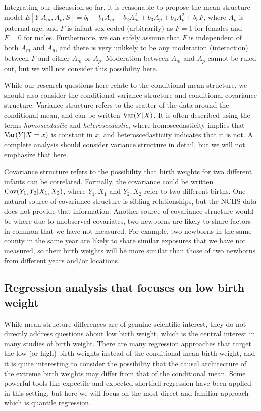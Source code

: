 Integrating our discussion so far, it is reasonable to propose the mean structure model $E[Y|A_m, A_p, S] = b_0 + b_1 A_m + b_2 A_m^2 + b_3A_p + b_4A_p^2 + b_5F$, where $A_p$ is paternal age, and $F$ is infant sex coded (arbitrarily) as $F=1$ for females and $F=0$ for males.  Furthermore, we can safely assume that $F$ is independent of both $A_m$ and $A_p$, and there is very unlikely to be any moderation (interaction) between $F$ and either $A_m$ or $A_p$.  Moderation between $A_m$ and $A_p$ cannot be ruled out, but we will not consider this possibility here.

While our research questions here relate to the conditional mean structure, we should also consider the conditional variance structure and conditional covariance structure.  Variance structure refers to the scatter of the data around the conditional mean, and can be written ${\rm Var}(Y|X)$.  It is often described using the terms {\em homoscedastic} and {\em heteroscedastic}, where homoscedasticity implies that ${\rm Var}(Y|X=x)$ is constant in $x$, and heteroscedasticity indicates that it is not.  A complete analysis should consider variance structure in detail, but we will not emphasize that here.

Covariance structure refers to the possibility that birth weights for two different infants can be correlated.  Formally, the covariance could be written ${\rm Cov}(Y_1, Y_2 | X_1, X_2)$, where $Y_1, X_1$ and $Y_2, X_2$ refer to two different births.  One natural source of covariance structure is sibling relationships, but the NCHS data does not provide that information.  Another source of covariance structure would be where due to unobserved covariates, two newborns are likely to share factors in common that we have not measured.  For example, two newborns in the same county in the same year are likely to share similar exposures that we have not measured, so their birth weights will be more similar than those of two newborns from different years and/or locations.

\subsection{Regression analysis that focuses on low birth weight}

While mean structure differences are of genuine scientific interest, they do not directly address questions about low birth weight, which is the central interest in many studies of birth weight.  There are many regression approaches that target the low (or high) birth weights instead of the conditional mean birth weight, and it is quite interesting to consider the possibility that the causal architecture of the extreme birth weights may differ from that of the conditional mean.  Some powerful tools like expectile and expected shortfall regression have been applied in this setting, but here we will focus on the most direct and familiar approach which is quantile regression.

